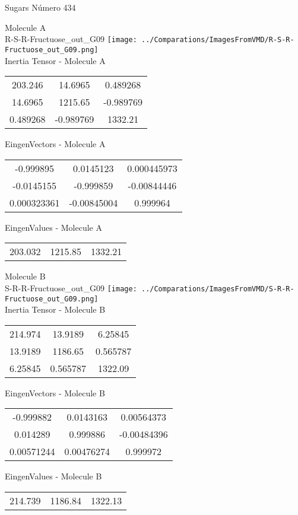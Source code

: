 \vtab[-2cm]
\begin{center}
{\large Sugars \tab Número 434}
\end{center}
\begin{multicols}{2}
\begin{center}

Molecule A \\ 
R-S-R-Fructuose\_out\_G09
\texttt{[image: ../Comparations/ImagesFromVMD/R-S-R-Fructuose\_out\_G09.png]}
\\
Inertia Tensor - Molecule A \\
\vtab

\begin{tabular}{|c c c|}
203.246	 & 	14.6965	 & 	0.489268	 \\
14.6965	 & 	1215.65	 & 	-0.989769	 \\
0.489268	 & 	-0.989769	 & 	1332.21
\end{tabular}

\vtab
 EingenVectors - Molecule A     \\
\vtab
\begin{tabular}{|c c c|}
-0.999895	 & 	0.0145123	 & 	0.000445973	 \\
-0.0145155	 & 	-0.999859	 & 	-0.00844446	 \\
0.000323361	 & 	-0.00845004	 & 	0.999964
\end{tabular}

\vtab
 EingenValues - Molecule A     \\
\vtab
\begin{tabular}{|c c c|}
203.032	 & 	1215.85	 & 	1332.21	 \\
\end{tabular}
\columnbreak

Molecule B \\ 
S-R-R-Fructuose\_out\_G09
\texttt{[image: ../Comparations/ImagesFromVMD/S-R-R-Fructuose\_out\_G09.png]}
\\
Inertia Tensor - Molecule B \\
\vtab

\begin{tabular}{|c c c|}
214.974	 & 	13.9189	 & 	6.25845	 \\
13.9189	 & 	1186.65	 & 	0.565787	 \\
6.25845	 & 	0.565787	 & 	1322.09
\end{tabular}

\vtab
 EingenVectors - Molecule B     \\
\vtab
\begin{tabular}{|c c c|}
-0.999882	 & 	0.0143163	 & 	0.00564373	 \\
0.014289	 & 	0.999886	 & 	-0.00484396	 \\
0.00571244	 & 	0.00476274	 & 	0.999972
\end{tabular}

\vtab
 EingenValues - Molecule B     \\
\vtab
\begin{tabular}{|c c c|}
214.739	 & 	1186.84	 & 	1322.13	 \\
\end{tabular}

\end{center}
\end{multicols}
